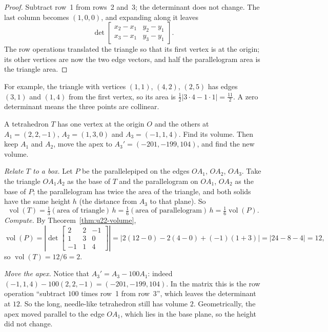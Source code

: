 \begin{proof}
Subtract row~1 from rows~2 and~3; the determinant does not change. The last column becomes
$(1,0,0)$, and expanding along it leaves
\[
  \det\begin{bmatrix} x_2-x_1 & y_2-y_1\\ x_3-x_1 & y_3-y_1\end{bmatrix}.
\]
The row operations translated the triangle so that its first vertex is at the origin; its
other vertices are now the two edge vectors, and half the parallelogram area is the triangle
area.
\end{proof}

For example, the triangle with vertices $(1,1)$, $(4,2)$, $(2,5)$ has edges $(3,1)$ and
$(1,4)$ from the first vertex, so its area is $\tfrac12|3\cdot4-1\cdot1|=\tfrac{11}{2}$. A
zero determinant means the three points are collinear.

\begin{example}\label{ex:u22-tetra}
A tetrahedron $T$ has one vertex at the origin $O$ and the others at
$A_1=(2,2,-1)$, $A_2=(1,3,0)$ and $A_3=(-1,1,4)$. Find its volume. Then keep $A_1$ and
$A_2$, move the apex to $A_3'=(-201,-199,104)$, and find the new volume.

\emph{Relate $T$ to a box.} Let $P$ be the parallelepiped on the edges $OA_1$, $OA_2$,
$OA_3$. Take the triangle $OA_1A_2$ as the base of $T$ and the parallelogram on $OA_1$,
$OA_2$ as the base of $P$; the parallelogram has twice the area of the triangle, and both
solids have the same height $h$ (the distance from $A_3$ to that plane). So
\[
  \operatorname{vol}(T)=\tfrac13(\text{area of triangle})\,h
  =\tfrac16(\text{area of parallelogram})\,h=\tfrac16\operatorname{vol}(P).
\]
\emph{Compute.} By Theorem~\ref{thm:u22-volume},
\[
  \operatorname{vol}(P)=\left|\det\begin{bmatrix} 2&2&-1\\ 1&3&0\\ -1&1&4\end{bmatrix}\right|
  =\bigl|2(12-0)-2(4-0)+(-1)(1+3)\bigr|=|24-8-4|=12,
\]
so $\operatorname{vol}(T)=12/6=2$.

\emph{Move the apex.} Notice that $A_3'=A_3-100A_1$: indeed
$(-1,1,4)-100(2,2,-1)=(-201,-199,104)$. In the matrix this is the row operation ``subtract
$100$ times row~1 from row~3'', which leaves the determinant at $12$. So the long, needle-like
tetrahedron still has volume $2$. Geometrically, the apex moved parallel to the edge $OA_1$,
which lies in the base plane, so the height did not change.
\end{example}


